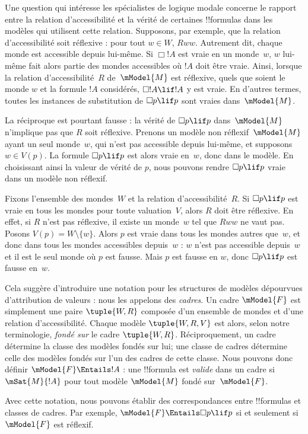 \documentclass[../../../include/open-logic-section]{subfiles}
\begin{document}


Une question qui intéresse les spécialistes de logique modale
concerne le rapport entre la relation d'accessibilité et la vérité
de certaines !!{formula}s dans les modèles qui utilisent cette
relation. Supposons, par exemple, que la relation d'accessibilité
soit réflexive : pour tout $w \in W$, $Rww$. Autrement dit, chaque
monde est accessible depuis lui-même. Si $\Box !A$ est vraie en un
monde~$w$, $w$ lui-même fait alors partie des mondes accessibles où
$!A$ doit être vraie. Ainsi, lorsque la relation d'accessibilité~$R$
de~$\mModel{M}$ est réflexive, quels que soient le monde $w$ et la
formule $!A$ considérés, $\Box !A \lif !A$ y est vraie. En
d'autres termes, toutes les instances de substitution de
$\Box p \lif p$ sont vraies dans~$\mModel{M}$.

La réciproque est pourtant fausse : la vérité de
$\Box p \lif p$ dans~$\mModel{M}$ n'implique pas que $R$ soit
réflexive. Prenons un modèle non réflexif~$\mModel{M}$ ayant un
seul monde~$w$, qui n'est pas accessible depuis lui-même, et
supposons $w \in V(p)$. La formule $\Box p \lif p$ est alors
vraie en~$w$, donc dans le modèle. En choisissant ainsi la
valeur de vérité de $p$, nous pouvons rendre $\Box p \lif p$ vraie
dans un modèle non réflexif.

Fixons l'ensemble des mondes~$W$ et la relation d'accessibilité~$R$.
Si $\Box p \lif p$ est vraie en tous les mondes pour toute
valuation~$V$, alors $R$ doit être réflexive. En effet, si $R$
n'est pas réflexive, il existe un monde~$w$ tel que $Rww$ ne vaut
pas. Posons
$V(p) = W \setminus \{w\}$. Alors $p$ est vraie dans tous les
mondes autres que~$w$, et donc dans tous les mondes accessibles
depuis~$w$ : $w$ n'est pas accessible depuis~$w$ et il est
le seul monde où $p$ est fausse. Mais $p$ est fausse en $w$,
donc $\Box p \lif p$ est fausse en~$w$.

Cela suggère d'introduire une notation pour les structures de
modèles dépourvues d'attribution de valeurs : nous les appelons
des \emph{cadres}. Un cadre $\mModel{F}$ est simplement une paire
$\tuple{W, R}$ composée d'un ensemble de mondes et d'une relation
d'accessibilité. Chaque modèle $\tuple{W, R, V}$ est alors,
selon notre terminologie, \emph{fondé sur} le cadre
$\tuple{W, R}$. Réciproquement, un cadre détermine la classe
des modèles fondés sur lui; une classe de cadres détermine celle
des modèles fondés sur l'un des cadres de cette classe. Nous
pouvons donc définir $\mModel{F} \Entails !A$ : une !!{formula}
est \emph{valide} dans un cadre si $\mSat{M}{!A}$ pour tout
modèle $\mModel{M}$ fondé sur~$\mModel{F}$.

Avec cette notation, nous pouvons établir des correspondances
entre !!{formula}s et classes de cadres. Par exemple,
$\mModel{F} \Entails \Box p \lif p$ si et seulement si
$\mModel{F}$ est réflexif.
\end{document}
